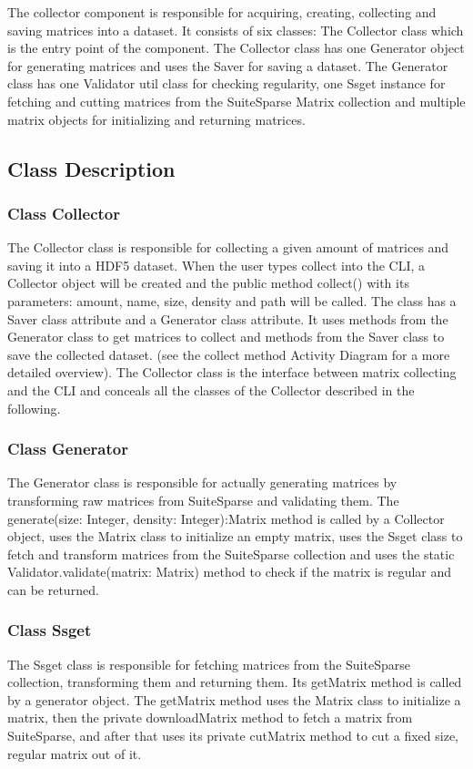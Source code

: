 \documentclass[parskip=full]{scrartcl}
\begin{document}
The collector component is responsible for acquiring, creating, collecting and saving matrices into a dataset.
It consists of six classes:
The Collector class which is the entry point of the component.
The Collector class has one Generator object for generating matrices and uses the Saver for saving a dataset.
The Generator class has one Validator util class for checking regularity, one Ssget instance for fetching and cutting matrices from the SuiteSparse Matrix collection and multiple matrix objects for initializing and returning matrices.

\subsection{Class Description}

\subsubsection{Class Collector}
The Collector class is responsible for collecting a given amount of matrices and saving it into a \gls{HDF5} dataset.
When the user types collect into the \gls{CLI}, a Collector object will be created and the public method collect() with its parameters:
amount, name, size, density and path
will be called. 
The class has a Saver class attribute and a Generator class attribute.
It uses methods from the Generator class to get matrices to collect and methods from the Saver class to save the collected dataset.
(see the collect method Activity Diagram for a more detailed overview).
The Collector class is the interface between matrix collecting and the \gls{CLI} and conceals all the classes of the Collector described in the following.

\subsubsection{Class Generator}
The Generator class is responsible for actually generating matrices by transforming raw matrices from SuiteSparse and validating them.
The generate(size: Integer, density: Integer):Matrix method is called by a Collector object, uses the Matrix class to initialize an empty matrix, uses the Ssget class to fetch and transform matrices from the SuiteSparse collection and uses the static Validator.validate(matrix: Matrix)  method to check if the matrix is regular and can be returned.

\subsubsection{Class Ssget}
The Ssget class is responsible for fetching matrices from the SuiteSparse collection, transforming them and returning them.
Its getMatrix method is called by a generator object.
The getMatrix method uses the Matrix class to initialize a matrix, then the private downloadMatrix method to fetch a matrix from SuiteSparse, and after that uses its private cutMatrix method to cut a fixed size, regular matrix out of it.
\end{document}
